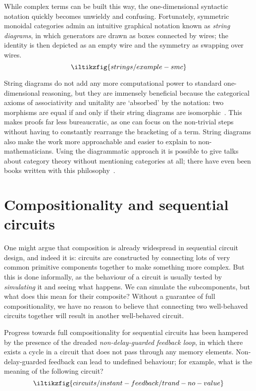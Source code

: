 While complex terms can be built this way, the one-dimensional
syntactic notation quickly becomes unwieldy and confusing.
Fortunately, symmetric monoidal categories admin an intuitive graphical notation
known as \emph{string diagrams}, in which generators are drawn as boxes connected
by wires; the identity is then depicted as an empty wire and the symmetry as
swapping over wires.
\[
    \iltikzfig{strings/example-smc}
\]

String diagrams do not add any more computational power to
standard one-dimensional reasoning, but they are
immensely beneficial because the categorical axioms of associativity and
unitality are `absorbed' by the notation: two morphisms are equal if and only if
their string diagrams are isomorphic~\cite{kelly1980coherence,kissinger2014abstract}.
This makes proofs far less bureaucratic, as one can focus on the non-trivial
steps without having to constantly rearrange the bracketing of a term.
String diagrams also make the work more approachable and easier to explain to
non-mathematicians.
Using the diagrammatic approach it is possible to give talks about category
theory without mentioning categories at all; there have even been books written
with this philosophy~\cite{coecke2018picturing}.


\section{Compositionality and sequential circuits}

One might argue that composition is already widespread in sequential circuit
design, and indeed it is: circuits are constructed by connecting lots of very
common primitive components together to make something more complex.
But this is done informally, as the behaviour of a circuit is usually tested
by \emph{simulating} it and seeing what happens.
We can simulate the subcomponents, but what does this mean for their composite?
Without a guarantee of full compositionality, we have no reason to
believe that connecting two well-behaved circuits together will result in
another well-behaved circuit.

Progress towards full compositionality for sequential circuits has been hampered
by the presence of the dreaded \emph{non-delay-guarded feedback loop}, in which
there exists a cycle in a circuit that does not pass through any memory elements.
Non-delay-guarded feedback can lead to undefined behaviour; for example, what is
the meaning of the following circuit?
\[
    \iltikzfig{circuits/instant-feedback/trand-no-value}
\]

